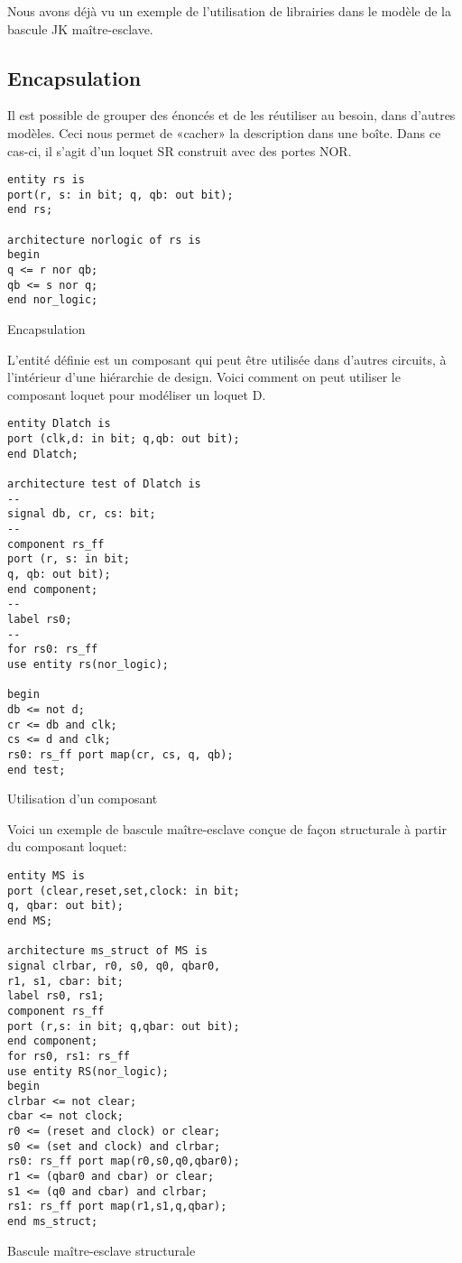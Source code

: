 \documentclass[11pt]{article}
\begin{document}
Nous avons déjà vu un exemple de l'utilisation de librairies dans le modèle
de la bascule JK maître-esclave.

\subsection{Encapsulation}
\label{sec:org13f0d89}

Il est possible de grouper des énoncés et de les réutiliser
au besoin, dans d'autres modèles. Ceci nous permet de «cacher» la
description dans une boîte. Dans ce cas-ci, il s'agit d'un loquet SR
construit avec des portes NOR.

\begin{listing}[htbp]
\begin{verbatim}
entity rs is
port(r, s: in bit; q, qb: out bit);
end rs;

architecture norlogic of rs is
begin
q <= r nor qb;
qb <= s nor q;
end nor_logic;
\end{verbatim}
\caption{Encapsulation}
\end{listing}

L'entité définie est un composant qui peut être utilisée dans
d'autres circuits, à l'intérieur d'une hiérarchie de design. Voici
comment on peut utiliser le composant loquet pour modéliser un loquet D.

\begin{listing}[htbp]
\begin{verbatim}
entity Dlatch is
port (clk,d: in bit; q,qb: out bit);
end Dlatch;

architecture test of Dlatch is
--
signal db, cr, cs: bit;
--
component rs_ff
port (r, s: in bit;
q, qb: out bit);
end component;
--
label rs0;
--
for rs0: rs_ff
use entity rs(nor_logic);

begin
db <= not d;
cr <= db and clk;
cs <= d and clk;
rs0: rs_ff port map(cr, cs, q, qb);
end test;
\end{verbatim}
\caption{Utilisation d'un composant}
\end{listing}

Voici un exemple de bascule maître-esclave conçue de façon structurale
à partir du composant loquet:

\begin{listing}[htbp]
\begin{verbatim}
entity MS is
port (clear,reset,set,clock: in bit;
q, qbar: out bit);
end MS;

architecture ms_struct of MS is
signal clrbar, r0, s0, q0, qbar0,
r1, s1, cbar: bit;
label rs0, rs1;
component rs_ff
port (r,s: in bit; q,qbar: out bit);
end component;
for rs0, rs1: rs_ff
use entity RS(nor_logic);
begin
clrbar <= not clear;
cbar <= not clock;
r0 <= (reset and clock) or clear;
s0 <= (set and clock) and clrbar;
rs0: rs_ff port map(r0,s0,q0,qbar0);
r1 <= (qbar0 and cbar) or clear;
s1 <= (q0 and cbar) and clrbar;
rs1: rs_ff port map(r1,s1,q,qbar);
end ms_struct;
\end{verbatim}
\caption{Bascule maître-esclave structurale}
\end{listing}
\end{document}
